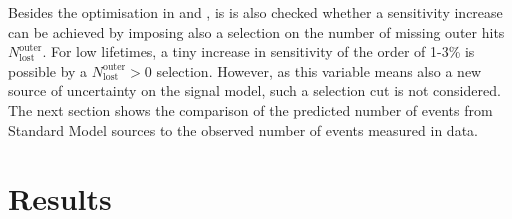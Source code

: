 Besides the optimisation in \ias and \pt, is is also checked whether a sensitivity increase can be achieved by imposing also a selection on the number of missing outer hits $N_{\text{lost}}^{\text{outer}}$.
For low lifetimes, a tiny increase in sensitivity of the order of 1-3\% is possible by a $N_{\text{lost}}^{\text{outer}}>0$ selection.
However, as this variable means also a new source of uncertainty on the signal model, such a selection cut is not considered.\\

The next section shows the comparison of the predicted number of events from Standard Model sources to the observed number of events measured in data.

\FloatBarrier
\chapter{Results}
\label{sec:Results}

